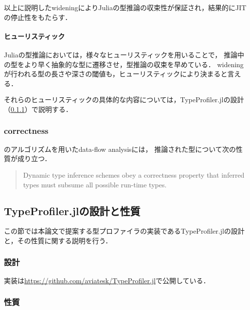以上に説明したwideningによりJuliaの型推論の収束性が保証され，結果的にJITの停止性をもたらす．

\paragraph{ヒューリスティック} \label{paragraph:inference-heuristic}

Juliaの型推論においては，様々なヒューリスティックを用いることで，
推論中の型をより早く抽象的な型に遷移させ，型推論の収束を早めている．
wideningが行われる型の長さや深さの閾値も，ヒューリスティックにより決まると言える．

それらのヒューリスティックの具体的な内容については，TypeProfiler.jlの設計（\ref{subsubsection:type-profiler-design}）で説明する．

\subsubsection{correctness} \label{subsubsection:inference-correctness}

\cite{graph-free-data-flow-analysis}のアルゴリズムを用いたdata-flow analysisには，
推論された型について次の性質が成り立つ\cite{jeff-master}．

\begin{quote}
  Dynamic type inference schemes obey a correctness property that inferred types
  must subsume all possible run-time types.
\end{quote}


\subsection{TypeProfiler.jlの設計と性質} \label{subsection:type-profiler-design-and-property}

この節では本論文で提案する型プロファイラの実装であるTypeProfiler.jlの設計と，その性質に関する説明を行う．

\subsubsection{設計} \label{subsubsection:type-profiler-design}



実装は\url{https://github.com/aviatesk/TypeProfiler.jl}で公開している．

\subsubsection{性質}




